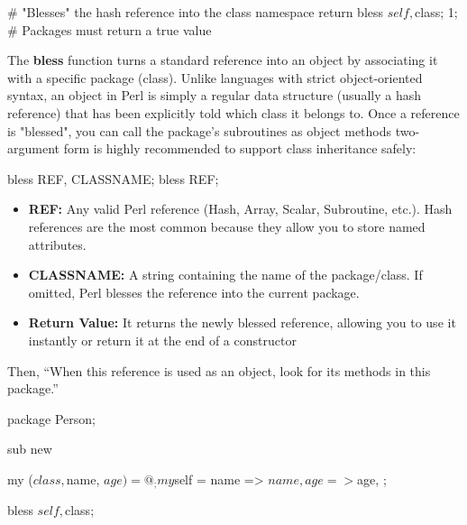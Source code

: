 \documentclass{report}
\begin{document}
\begin{itemize}
\begin{perlcode}
{                    # "Blesses" the hash reference into the class namespace
                    return bless $self, $class; 
                }
                1; # Packages must return a true value
            \end{perlcode}
            \bigbreak \noindent 
            The \textbf{bless} function turns a standard reference into an object by associating it with a specific package (class).
            \bigbreak \noindent 
            Unlike languages with strict object-oriented syntax, an object in Perl is simply a regular data structure (usually a hash reference) that has been explicitly told which class it belongs to. Once a reference is "blessed", you can call the package's subroutines as object methods
            \bigbreak \noindent 
            two-argument form is highly recommended to support class inheritance safely:
            \bigbreak \noindent 
            \begin{perlcode}
            bless REF, CLASSNAME;
            bless REF;
            \end{perlcode}
            \begin{itemize}
                \item \textbf{REF:} Any valid Perl reference (Hash, Array, Scalar, Subroutine, etc.). Hash references are the most common because they allow you to store named attributes.
                \item \textbf{CLASSNAME:} A string containing the name of the package/class. If omitted, Perl blesses the reference into the current package.
                \item \textbf{Return Value:} It returns the newly blessed reference, allowing you to use it instantly or return it at the end of a constructor
            \end{itemize}
            Then, “When this reference is used as an object, look for its methods in this package.”
            \bigbreak \noindent 
            \begin{perlcode}
                package Person;

                sub new {
                    my ($class, $name, $age) = @_;

                    my $self = {
                        name => $name,
                        age  => $age,
                    };

                    bless $self, $class;

}
\end{perlcode}
\end{itemize}
\end{document}

